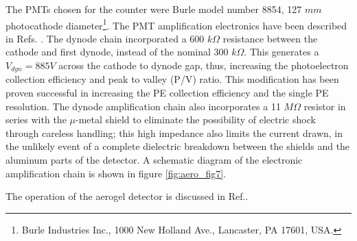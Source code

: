The PMTs chosen for the counter were Burle model number 8854, 127 $mm$
photocathode 
diameter\footnote{Burle Industries Inc., 1000 New Holland Ave., Lancaster, PA 17601, USA.}.
  The PMT amplification electronics have
been described in Refs. \cite{Alexa:1995ne,Lolos:1997vz}.  The dynode chain incorporated a
600 $k\Omega$ resistance between the cathode and first dynode, instead of the
nominal 300 $k\Omega$.  This generates a $V_{dyn}=885 V$ across the cathode to
dynode gap, thus, increasing the photoelectron collection efficiency and peak
to valley (P/V) ratio.  This modification has been proven successful in
increasing the PE collection efficiency and the single PE resolution.  The
dynode amplification chain also incorporates a 11 $M\Omega$ resistor in series
with the $\mu$-metal shield to eliminate the possibility of electric shock
through careless handling; this high impedance also limits the current drawn,
in the unlikely event of a complete dielectric breakdown between the shields
and the aluminum parts of the detector. A schematic diagram of the electronic 
amplification chain is shown in figure \ref{fig:aero_fig7}. 

The operation of the aerogel detector is discussed in Ref.\cite{Brash:2002vn}.




